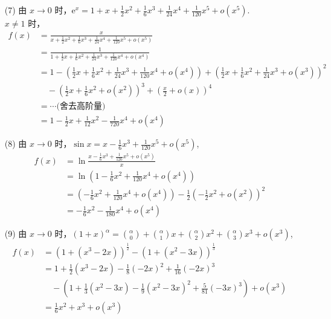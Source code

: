 \documentclass{article}
\begin{document}
\begin{itemize}
    \item [(7)] 
    由 $x \to 0$ 时，$\mathrm{e}^x = 1 + x + \frac{1}{2}x^2 + \frac{1}{6}x^3 + \frac{1}{24}x^4 + \frac{1}{120}x^5 + o(x^5)$. \\
    $x \neq 1$ 时，
    \begin{align*}
        f(x) & = \frac{x}{x + \frac{1}{2}x^2 + \frac{1}{6}x^3 + \frac{1}{24}x^4 + \frac{1}{120}x^5 + o(x^5)} \\
        & = \frac{1}{1 + \frac{1}{2}x + \frac{1}{6}x^2 + \frac{1}{24}x^3 + \frac{1}{120}x^4 + o(x^4)} \\
        & = 1 - \left(\frac{1}{2}x + \frac{1}{6}x^2 + \frac{1}{24}x^3 + \frac{1}{120}x^4 + o(x^4)\right) + \left(\frac{1}{2}x + \frac{1}{6}x^2 + \frac{1}{24}x^3 + o(x^3)\right)^2 \\
        & \quad - \left(\frac{1}{2}x + \frac{1}{6}x^2 + o(x^2)\right)^3 + \left(\frac{x}{2} + o(x)\right)^4 \\
        & = \cdots \text{(舍去高阶量)} \\
        & = 1 - \frac{1}{2}x + \frac{1}{12}x^2 - \frac{1}{720}x^4 + o(x^4)
    \end{align*}
    \item [(8)] 由 $x \to 0$ 时，$\sin x = x - \frac{1}{6}x^3 + \frac{1}{120}x^5 + o(x^5)$, \\
    \begin{align*}
        f(x) & = \ln \frac{x - \frac{1}{6}x^3 + \frac{1}{120}x^5 + o(x^5)}{x} \\
        & = \ln \left(1 - \frac{1}{6}x^2 + \frac{1}{120}x^4 + o(x^4)\right) \\
        & = \left(- \frac{1}{6}x^2 + \frac{1}{120}x^4 + o(x^4)\right) - \frac{1}{2}\left(-\frac{1}{2}x^2 + o(x^2)\right)^2 \\
        & = -\frac{1}{6}x^2 - \frac{1}{180}x^4 + o(x^4)
    \end{align*}
    \item [(9)] 由 $x \to 0$ 时，$(1 + x)^\alpha = \binom{\alpha}{0} + \binom{\alpha}{1}x + \binom{\alpha}{2}x^2 + \binom{\alpha}{3}x^3 + o(x^3) $, \\
    \begin{align*}
        f(x) & = (1 + (x^3 - 2x))^{\frac{1}{2}} - (1 + (x^2 - 3x))^{\frac{1}{3}} \\
        & = 1 + \frac{1}{2}(x^3 - 2x) - \frac{1}{8}(-2x)^2 + \frac{1}{16}(-2x)^3 \\
        & \quad - \left(1 + \frac{1}{3}(x^2 - 3x) - \frac{1}{9}(x^2 - 3x)^2 + \frac{5}{81}(-3x)^3\right) + o(x^3)\\
        & = \frac{1}{6}x^2 + x^3 + o(x^3)
    \end{align*}
\end{itemize}
\end{document}
